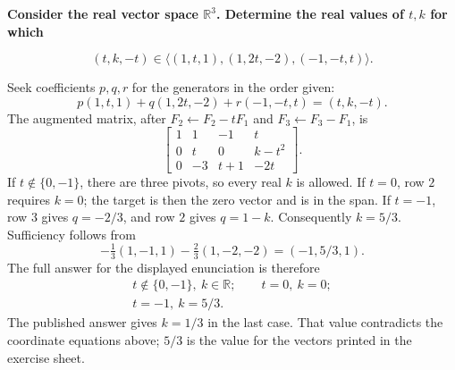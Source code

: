 \providecommand{\rank}{\operatorname{r}}
\providecommand{\RR}{\mathbb R}
\providecommand{\CC}{\mathbb C}
\providecommand{\KK}{\mathbb K}

\setcounter{enumi}{74}
\item {\bfseries\boldmath
Consider the real vector space $\RR^3$. Determine the real values of $t,k$ for which
}

\[
(t,k,-t)\in\langle(1,t,1),(1,2t,-2),(-1,-t,t)\rangle.
\]

\begin{answer}
Seek coefficients $p,q,r$ for the generators in the order given:
\[
 p(1,t,1)+q(1,2t,-2)+r(-1,-t,t)=(t,k,-t).
\]
The augmented matrix, after $F_2\gets F_2-tF_1$ and $F_3\gets F_3-F_1$, is
\[
 \left[\begin{array}{rrr|r}
 1&1&-1&t\\0&t&0&k-t^2\\0&-3&t+1&-2t
 \end{array}\right].
\]
If $t\notin\{0,-1\}$, there are three pivots, so every real $k$ is allowed.
If $t=0$, row $2$ requires $k=0$; the target is then the zero vector and is
in the span.
If $t=-1$, row $3$ gives $q=-2/3$, and row $2$ gives $q=1-k$.
Consequently $k=5/3$. Sufficiency follows from
\[
 -\tfrac13(1,-1,1)-\tfrac23(1,-2,-2)=(-1,5/3,1).
\]
The full answer for the displayed enunciation is therefore
\[
 \boxed{\begin{gathered}
 t\notin\{0,-1\},\ k\in\RR;\qquad t=0,\ k=0;\\
 t=-1,\ k=5/3.
 \end{gathered}}
\]
The published answer gives $k=1/3$ in the last case. That value contradicts
the coordinate equations above; $5/3$ is the value for the vectors printed
in the exercise sheet.
\end{answer}
